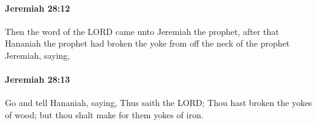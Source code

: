 		\paragraph{Jeremiah 28:12} %
			\label{JEREMIAH-28-12}

			Then the word of the LORD came unto Jeremiah the prophet, after that Hananiah the prophet had broken the yoke from off the neck of the prophet Jeremiah, saying,


		\paragraph{Jeremiah 28:13} %
			\label{JEREMIAH-28-13}

			Go and tell Hananiah, saying, Thus saith the LORD; Thou hast broken the yokes of wood; but thou shalt make for them yokes of iron.


